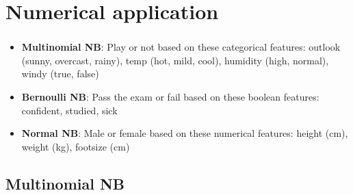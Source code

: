 \documentclass[xcolor=table]{beamer}
\begin{document}
\section{Numerical application}

\begin{frame}
	\frametitle{\insertshortsubtitle}
	\framesubtitle{\insertsection}
	
	\begin{itemize}
		\item \textbf{Multinomial NB}: Play or not based on these categorical features: outlook (sunny, overcast, rainy), temp (hot, mild, cool), humidity (high, normal), windy (true, false)
		\item \textbf{Bernoulli NB}: Pass the exam or fail based on these boolean features: confident, studied, sick
		\item \textbf{Normal NB}: Male or female based on these numerical features: height (cm), weight (kg), footsize (cm)
	\end{itemize}
	
	
\end{frame}

\subsection{Multinomial NB}
\end{document}
